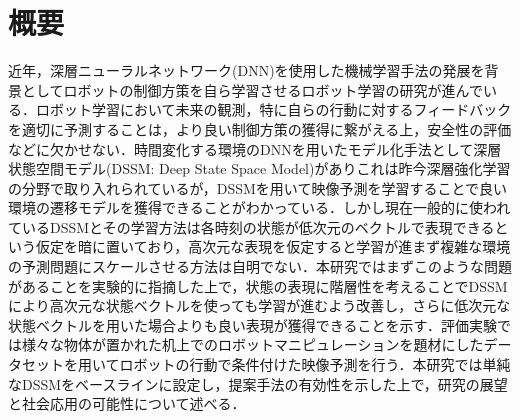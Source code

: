 \chapter*{概要}
\label{chap:abstract}

近年，深層ニューラルネットワーク(DNN)を使用した機械学習手法の発展を背景としてロボットの制御方策を自ら学習させるロボット学習の研究が進んでいる．ロボット学習において未来の観測，特に自らの行動に対するフィードバックを適切に予測することは，より良い制御方策の獲得に繋がえる上，安全性の評価などに欠かせない．時間変化する環境のDNNを用いたモデル化手法として深層状態空間モデル(DSSM: Deep State Space Model)がありこれは昨今深層強化学習の分野で取り入れられているが，DSSMを用いて映像予測を学習することで良い環境の遷移モデルを獲得できることがわかっている．しかし現在一般的に使われているDSSMとその学習方法は各時刻の状態が低次元のベクトルで表現できるという仮定を暗に置いており，高次元な表現を仮定すると学習が進まず複雑な環境の予測問題にスケールさせる方法は自明でない．本研究ではまずこのような問題があることを実験的に指摘した上で，状態の表現に階層性を考えることでDSSMにより高次元な状態ベクトルを使っても学習が進むよう改善し，さらに低次元な状態ベクトルを用いた場合よりも良い表現が獲得できることを示す．評価実験では様々な物体が置かれた机上でのロボットマニピュレーションを題材にしたデータセットを用いてロボットの行動で条件付けた映像予測を行う．本研究では単純なDSSMをベースラインに設定し，提案手法の有効性を示した上で，研究の展望と社会応用の可能性について述べる．




